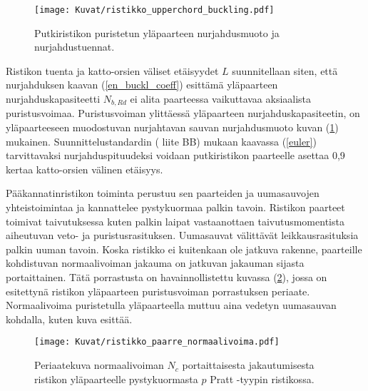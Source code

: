 \documentclass[12pt]{article}
\newenvironment{content}{\pagenumbering{arabic}}{}
\begin{document}
\begin{content}
\begin{figure}[htb]
\texttt{[image: Kuvat/ristikko\_upperchord\_buckling.pdf]}
\caption{Putkiristikon puristetun yläpaarteen nurjahdusmuoto ja nurjahdustuennat.}
\label{fig:ristikon_nurjahdus}
\end{figure}

Ristikon tuenta ja katto-orsien väliset etäisyydet $L$ suunnitellaan siten, että nurjahduksen kaavan (\ref{en_buckl_coeff}) esittämä yläpaarteen nurjahduskapasiteetti $N_{b,Rd}$ ei alita paarteessa vaikuttavaa aksiaalista puristusvoimaa. Puristusvoiman ylittäessä yläpaarteen nurjahduskapasiteetin, on yläpaarteeseen muodostuvan nurjahtavan sauvan nurjahdusmuoto kuvan (\ref{fig:ristikon_nurjahdus}) mukainen. Suunnittelustandardin (\citeauthor{en1993} liite BB) mukaan kaavassa (\ref{euler}) tarvittavaksi nurjahduspituudeksi voidaan putkiristikon paarteelle asettaa 0,9 kertaa katto-orsien välinen etäisyys.

Pääkannatinristikon toiminta perustuu sen paarteiden ja uumasauvojen yhteistoimintaa ja kannattelee pystykuormaa palkin tavoin. Ristikon paarteet toimivat taivutuksessa kuten palkin laipat vastaanottaen taivutusmomentista aiheutuvan veto- ja puristusrasituksen. Uumasauvat välittävät leikkausrasituksia palkin uuman tavoin. Koska ristikko ei kuitenkaan ole jatkuva rakenne, paarteille kohdistuvan normaalivoiman jakauma on jatkuvan jakauman sijasta portaittainen. Tätä porrastusta on havainnollistettu kuvassa (\ref{fig:ristikon_yläpaarteen_puristus}), jossa on esitettynä ristikon yläpaarteen puristusvoiman porrastuksen periaate. Normaalivoima puristetulla yläpaarteella muttuu aina vedetyn uumasauvan kohdalla, kuten kuva esittää. 

\begin{figure}[htb]
\texttt{[image: Kuvat/ristikko\_paarre\_normaalivoima.pdf]}
\caption{Periaatekuva normaalivoiman $N_c$ portaittaisesta jakautumisesta ristikon yläpaarteelle pystykuormasta $p$ Pratt -tyypin ristikossa.}
\label{fig:ristikon_yläpaarteen_puristus}
\end{figure}









\end{content}
\end{document}
